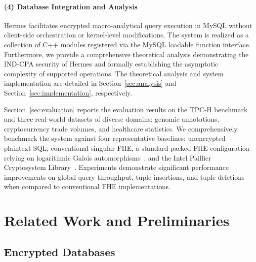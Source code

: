 \documentclass[sigconf,nonacm]{acmart}
\begin{document}
\paragraph{(4) Database Integration and Analysis}
Hermes facilitates encrypted macro-analytical query execution in MySQL without client-side orchestration or kernel-level modifications. The system is realized as a collection of C++ modules registered via the MySQL loadable function interface. Furthermore, we provide a comprehensive theoretical analysis demonstrating the IND-CPA security of Hermes and formally establishing the asymptotic complexity of supported operations. The theoretical analysis and system implementation are detailed in Section~\ref{sec:analysis} and Section~\ref{sec:implementation}, respectively.

Section~\ref{sec:evaluation} reports the evaluation results on the TPC-H benchmark and three real-world datasets of diverse domains: genomic annotations, cryptocurrency trade volumes, and healthcare statistics. We comprehensively benchmark the system against four representative baselines: unencrypted plaintext SQL, conventional singular FHE, a standard packed FHE configuration relying on logarithmic Galois automorphisms~\cite{openfhe}, and the Intel Paillier Cryptosystem Library~\cite{ipcl_github}. Experiments demonstrate significant performance improvements on global query throughput, tuple insertions, and tuple deletions when compared to conventional FHE implementations.

\section{Related Work and Preliminaries}

\subsection{Encrypted Databases}
\end{document}
